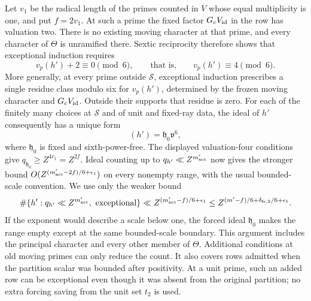 \documentclass[12pt]{article}
\begin{document}
Let \(v_1\) be the radical length of the primes counted in \(V\)
whose equal multiplicity is one, and put \(f=2v_1\).  At such a
prime the fixed factor \(G_cV_{\rm id}\) in the row has valuation
two.  There is no existing moving character at that prime, and
every character of \(\Theta\) is unramified there.  Sextic
reciprocity therefore shows that exceptional induction requires
\[
 v_p(h')+2\equiv0\pmod6,\qquad\text{that is,}\qquad
 v_p(h')\equiv4\pmod6.
\]
More generally, at every prime outside \(\mathcal S\), exceptional
induction prescribes a single residue class modulo six for
\(v_p(h')\), determined by the frozen moving character and
\(G_cV_{\rm id}\).  Outside their supports that residue is zero.
For each of the finitely many choices at \(\mathcal S\) and of
unit and fixed-ray data, the ideal of \(h'\) consequently has a
unique form
\[
 (h')=\mathfrak h_0\mathfrak v^6,
\]
where \(\mathfrak h_0\) is fixed and sixth-power-free.  The
displayed valuation-four conditions give
\(q_{\mathfrak h_0}\ge Z^{4v_1}=Z^{2f}\).
Ideal counting up to \(q_{h'}\ll Z^{m'_{\rm act}}\) now gives the
stronger bound \(O(Z^{(m'_{\rm act}-2f)/6+\epsilon_1})\) on every
nonempty range, with the usual bounded-scale convention.  We use
only the weaker bound
\begin{equation}
 \#\{h':q_{h'}\ll Z^{m'_{\rm act}},\ \text{exceptional}\}
 \ll Z^{(m'_{\rm act}-f)/6+\epsilon_1}
 \le Z^{(m'-f)/6+\delta_{{\rm fr},2}/6+\epsilon_1}.
 \label{eq:exceptional-row-count}
\end{equation}
If the exponent would describe a scale below one, the forced ideal
\(\mathfrak h_0\) makes the range empty except at the same
bounded-scale boundary.  This argument includes the principal
character and every other member of \(\Theta\).  Additional
conditions at old moving primes can only reduce the count.
It also covers rows admitted when the partition scalar was bounded
after positivity.  At a unit prime, such an added row can be
exceptional even though it was absent from the original partition;
no extra forcing saving from the unit set \(t_2\) is used.
\end{document}
